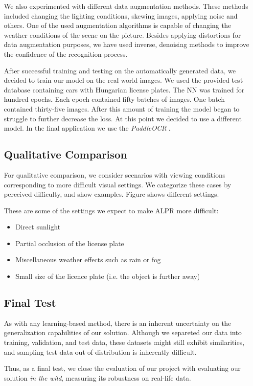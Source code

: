 We also experimented with different data augmentation methods.
These methods included changing the lighting conditions, skewing images, applying noise and others.
One of the used augmentation algorithms is capable of changing the weather conditions of the scene on the picture.
Besides applying distortions for data augmentation purposes, we have used inverse, denoising methods to improve the confidence of the recognition process.

After successful training and testing on the automatically generated data,
we decided to train our model on the real world images.
We used the provided test database containing cars with Hungarian license plates.
The \ac{NN} was trained for hundred epochs.
Each epoch contained fifty batches of images.
One batch contained thirty-five images.
After this amount of training the model began to struggle to further decrease the loss.
At this point we decided to use a different model.
In the final application we use the \emph{PaddleOCR} \cite{DBLP:journals/corr/abs-2009-09941}.






\subsection{Qualitative Comparison}
For qualitative comparison, we consider scenarios with viewing conditions
corresponding to more difficult visual settings. We categorize these cases by
perceived difficulty, and show examples. Figure  shows
different settings. 

These are some of the settings we expect to make \ac{ALPR} more
difficult:
\begin{itemize}
    \item Direct sunlight 
    \item Partial occlusion of the license plate 
    \item Miscellaneous weather effects such as rain or fog
    \item Small size of the licence plate (i.e. the object is further away)
\end{itemize}

\subsection{Final Test}
As with any learning-based method, there is an inherent uncertainty on the
generalization capabilities of our solution. Although we separeted our data into
training, validation, and test data, these datasets might still exhibit
similarities, and sampling test data out-of-distribution is inherently
difficult.

Thus, as a final test, we close the evaluation of our project with evaluating
our solution \textit{in the wild}, measuring its robustness on real-life data.

